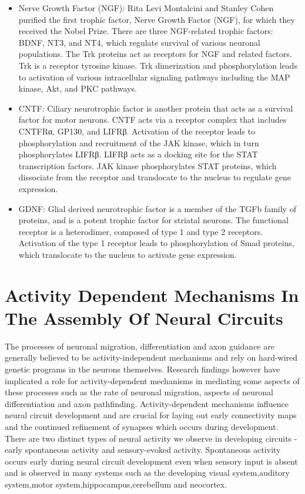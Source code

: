 \begin{itemize}
\tightlist
\item
  Nerve Growth Factor (NGF): Rita Levi Montalcini and Stanley Cohen purified the first trophic factor, Nerve Growth Factor (NGF), for which they received the Nobel Prize. There are three NGF-related trophic factors: BDNF, NT3, and NT4, which regulate survival of various neuronal populations. The Trk proteins act as receptors for NGF and related factors. Trk is a receptor tyrosine kinase. Trk dimerization and phosphorylation leads to activation of various intracellular signaling pathways including the MAP kinase, Akt, and PKC pathways.
\item
  CNTF: Ciliary neurotrophic factor is another protein that acts as a survival factor for motor neurons. CNTF acts via a receptor complex that includes CNTFRα, GP130, and LIFRβ. Activation of the receptor leads to phosphorylation and recruitment of the JAK kinase, which in turn phosphorylates LIFRβ. LIFRβ acts as a docking site for the STAT transcription factors. JAK kinase phosphorylates STAT proteins, which dissociate from the receptor and translocate to the nucleus to regulate gene expression.
\item
  GDNF: Glial derived neurotrophic factor is a member of the TGFb family of proteins, and is a potent trophic factor for striatal neurons. The functional receptor is a heterodimer, composed of type 1 and type 2 receptors. Activation of the type 1 receptor leads to phosphorylation of Smad proteins, which translocate to the nucleus to activate gene expression.
\end{itemize}

\hypertarget{activity-dependent-mechanisms-in-the-assembly-of-neural-circuits}{%
\section{Activity Dependent Mechanisms In The Assembly Of Neural Circuits}\label{activity-dependent-mechanisms-in-the-assembly-of-neural-circuits}}

The processes of neuronal migration, differentiation and axon guidance are generally believed to be activity-independent mechanisms and rely on hard-wired genetic programs in the neurons themselves. Research findings however have implicated a role for activity-dependent mechanisms in mediating some aspects of these processes such as the rate of neuronal migration, aspects of neuronal differentiation and axon pathfinding. Activity-dependent mechanisms influence neural circuit development and are crucial for laying out early connectivity maps and the continued refinement of synapses which occurs during development. There are two distinct types of neural activity we observe in developing circuits -early spontaneous activity and sensory-evoked activity. Spontaneous activity occurs early during neural circuit development even when sensory input is absent and is observed in many systems such as the developing visual system,auditory system,motor system,hippocampus,cerebellum and neocortex.

